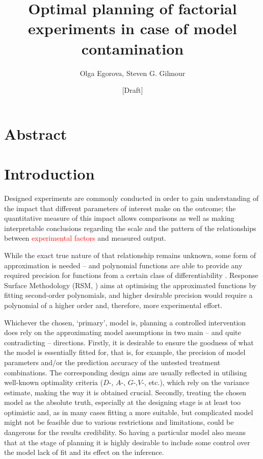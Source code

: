 \documentclass[11pt]{article}
\newcommand{\highlight}{\textcolor{red}}
\begin{document}
\title{Optimal planning of factorial experiments in case of model contamination}
\author{\large{Olga Egorova, Steven G. Gilmour}}
\date{[Draft]}
\maketitle

\tableofcontents

\newpage
\section*{Abstract}

\section{Introduction}

Designed experiments are commonly conducted in order to gain understanding of the impact that different parameters of interest make on the outcome; the quantitative measure of this impact allows comparisons as well as making interpretable conclusions regarding the scale and the pattern of the relationships between \highlight{experimental factors} and measured output. 

While the exact true nature of that relationship remains unknown, some form of approximation is needed -- and polynomial functions are able to provide any required precision for functions from a certain class of differentiability \citep{Rudin1987real}. Response Surface Methodology (RSM, \cite{Box1951Roy}) aims at optimising the approximated functions by fitting second-order polynomials, and higher desirable precision would require a polynomial of a higher order and, therefore, more experimental effort. 

Whichever the chosen, `primary',  model is, planning a controlled intervention does rely on the approximating model assumptions in two main -- and quite contradicting -- directions. Firstly, it is desirable to ensure the goodness of what the model is essentially fitted for, that is, for example, the precision of model parameters and/or the prediction accuracy of the untested treatment combinations. The corresponding design aims are usually reflected in utilising well-known optimality criteria ($D$-, $A$-, $G$-,$V$-, etc.), which rely on the variance estimate, making the way it is obtained crucial. Secondly, treating the chosen model as the absolute truth, especially at the designing stage is at least too optimistic and, as in many cases fitting a more suitable, but complicated model might not be feasible due to various restrictions and limitations, could be dangerous for the results credibility. So having a particular model also means that at the stage of planning it is highly desirable to include some control over the model lack of fit and its effect on the inference. 
\end{document}
